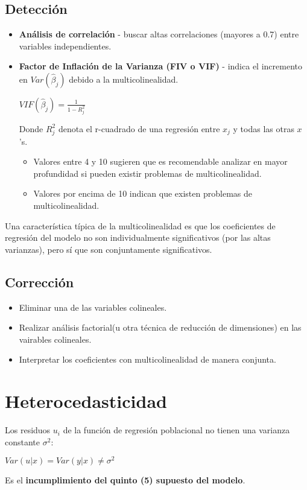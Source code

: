 \documentclass[10pt, a4paper, landscape]{extarticle}
\begin{document}
\begin{multicols}{3}
	\subsection*{Detección}
		\begin{itemize}[leftmargin=*]
			\item \textbf{Análisis de correlación} - buscar altas correlaciones (mayores a 0.7) entre variables independientes.
			\item \textbf{Factor de Inflación de la Varianza (FIV o VIF)} - indica el incremento en $Var(\hat{\beta}_j)$ debido a la multicolinealidad.
			\begin{center}
				$VIF(\hat{\beta}_j) = \frac{1}{1-R_j^2}$
			\end{center}
			Donde $R^2_j$ denota el r-cuadrado de una regresión entre $x_j$ y todas las otras $x$'s. 
			\begin{itemize}[leftmargin=*]
				\item Valores entre 4 y 10 sugieren que es recomendable analizar en mayor profundidad si pueden existir problemas de multicolinealidad.
				\item Valores por encima de 10 indican que existen problemas de multicolinealidad.
			\end{itemize}
		\end{itemize}
		Una característica típica de la multicolinealidad es que los coeficientes de regresión del modelo no son individualmente significativos (por las altas varianzas), pero sí que son conjuntamente significativos.
	\subsection*{Corrección}
		\begin{itemize}[leftmargin=*]
			\item Eliminar una de las variables colineales.
			\item Realizar análisis factorial(u otra técnica de reducción de dimensiones) en las vairables colineales.
			\item Interpretar los coeficientes con multicolinealidad de manera conjunta.
		\end{itemize}

\columnbreak

\section*{Heterocedasticidad}
	Los residuos $u_i$ de la función de regresión poblacional no tienen una varianza constante $\sigma^2$:
	\begin{center}
		$Var(u|x) = Var(y|x) \neq \sigma^2$
	\end{center}
	Es el \textbf{incumplimiento del quinto (5) supuesto del modelo}.

\end{multicols}
\end{document}
